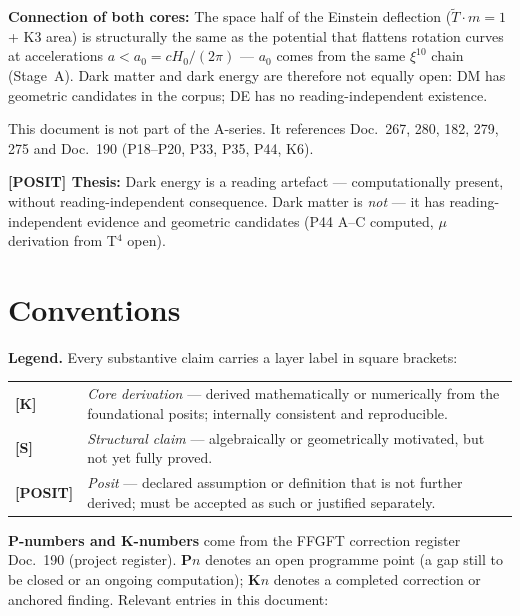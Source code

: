 \medskip
\noindent\textbf{Connection of both cores:} The space half of the
Einstein deflection ($\tilde T \cdot m = 1$ + K3 area) is structurally
the same as the potential that flattens rotation curves at accelerations
$a < a_0 = cH_0/(2\pi)$ — $a_0$ comes from the same $\xi^{10}$ chain
(Stage~A). Dark matter and dark energy are therefore not equally open:
DM has geometric candidates in the corpus; DE has no reading-independent
existence.

This document is not part of the A-series. It references
Doc.~267, 280, 182, 279, 275 and Doc.~190 (P18--P20, P33, P35, P44, K6).

\medskip
\noindent\textbf{[POSIT] Thesis:} Dark energy is a reading artefact —
computationally present, without reading-independent consequence.
Dark matter is \emph{not} — it has reading-independent evidence and
geometric candidates (P44 A–C computed, $\mu$ derivation from T$^4$
open).

\section*{Conventions}

\noindent\textbf{Legend.} Every substantive claim carries a layer
label in square brackets:

\medskip
\begin{tabular}{@{}lp{11cm}}
\textbf{[K]}      & \emph{Core derivation} — derived mathematically
                    or numerically from the foundational posits;
                    internally consistent and reproducible. \\[4pt]
\textbf{[S]}      & \emph{Structural claim} — algebraically or
                    geometrically motivated, but not yet fully proved. \\[4pt]
\textbf{[POSIT]}  & \emph{Posit} — declared assumption or definition
                    that is not further derived; must be accepted as
                    such or justified separately. \\
\end{tabular}

\medskip
\noindent\textbf{P-numbers and K-numbers} come from the FFGFT
correction register Doc.~190 (project register). \textbf{P}$n$
denotes an open programme point (a gap still to be closed or an
ongoing computation); \textbf{K}$n$ denotes a completed correction
or anchored finding. Relevant entries in this document:

